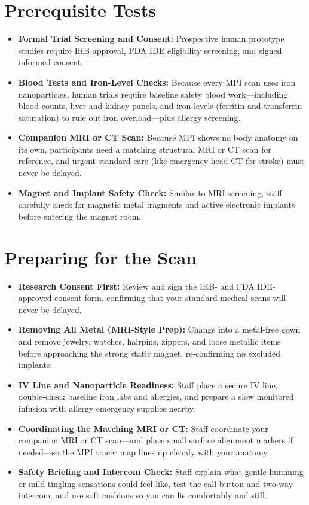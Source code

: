 \section{Prerequisite Tests}
\begin{itemize}
  \item \textbf{Formal Trial Screening and Consent:} Prospective human prototype studies require IRB approval, FDA IDE eligibility screening, and signed informed consent.
  \item \textbf{Blood Tests and Iron-Level Checks:} Because every MPI scan uses iron nanoparticles, human trials require baseline safety blood work---including blood counts, liver and kidney panels, and iron levels (ferritin and transferrin saturation) to rule out iron overload---plus allergy screening.
  \item \textbf{Companion MRI or CT Scan:} Because MPI shows no body anatomy on its own, participants need a matching structural MRI or CT scan for reference, and urgent standard care (like emergency head CT for stroke) must never be delayed.
  \item \textbf{Magnet and Implant Safety Check:} Similar to MRI screening, staff carefully check for magnetic metal fragments and active electronic implants before entering the magnet room.
\end{itemize}

\section{Preparing for the Scan}
\begin{itemize}
  \item \textbf{Research Consent First:} Review and sign the IRB- and FDA IDE-approved consent form, confirming that your standard medical scans will never be delayed.
  \item \textbf{Removing All Metal (MRI-Style Prep):} Change into a metal-free gown and remove jewelry, watches, hairpins, zippers, and loose metallic items before approaching the strong static magnet, re-confirming no excluded implants.
  \item \textbf{IV Line and Nanoparticle Readiness:} Staff place a secure IV line, double-check baseline iron labs and allergies, and prepare a slow monitored infusion with allergy emergency supplies nearby.
  \item \textbf{Coordinating the Matching MRI or CT:} Staff coordinate your companion MRI or CT scan---and place small surface alignment markers if needed---so the MPI tracer map lines up cleanly with your anatomy.
  \item \textbf{Safety Briefing and Intercom Check:} Staff explain what gentle humming or mild tingling sensations could feel like, test the call button and two-way intercom, and use soft cushions so you can lie comfortably and still.
\end{itemize}

